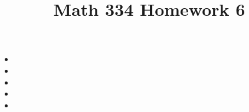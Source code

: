 \documentclass{article}
\title{Math 334 Homework 6}
\begin{document}
\maketitle
\begin{itemize}[label=]
	\item 
	\item 
	\item 
	\item 
	\item 
\end{itemize}
\end{document}
